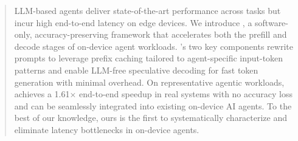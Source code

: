 \begin{abstract}
LLM-based agents deliver state-of-the-art performance across tasks but incur high end-to-end latency on edge devices. We introduce \proposed, a software-only, accuracy-preserving framework that accelerates both the prefill and decode stages of on-device agent workloads. \proposed's two key components rewrite prompts to leverage prefix caching tailored to agent-specific input-token patterns and enable LLM-free speculative decoding for fast token generation with minimal overhead. On representative agentic workloads, \proposed achieves a 1.61$\times$ end-to-end speedup in real systems with no accuracy loss and can be seamlessly integrated into existing on-device AI agents. To the best of our knowledge, ours is the first to systematically characterize and eliminate latency bottlenecks in on-device agents.
\end{abstract}